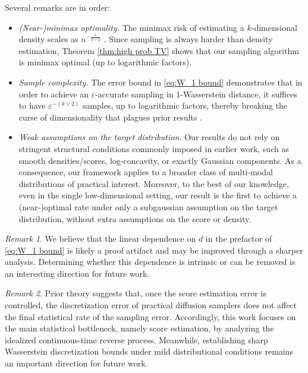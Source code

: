 \documentclass{article}
\newcommand{\veps}{\varepsilon}
\theoremstyle{plain}
\theoremstyle{remark}
\newtheorem{remark}{Remark}
\begin{document}
Several remarks are in order:
\begin{itemize}
    \item \textit{(Near-)minimax optimality.} The minimax risk of estimating a $k$-dimensional density scales as $n^{-\frac{1}{k \vee 2}}$ \citep{chewi2024statisticaloptimaltransport}.
    Since sampling is always harder than density estimation, Theorem \ref{thm:high prob TV} shows that our sampling algorithm is minimax optimal (up to logarithmic factors).
    
    \item \textit{Sample complexity.} The error bound in \eqref{eq:W_1 bound} demonstrates that in order to achieve an $\veps$-accurate sampling in 1-Wasserstein distance, it suffices to have $\veps^{- (k \vee 2)}$ samples, up to logarithmic factors, thereby breaking the curse of dimensionality that plagues prior results \citep{wibisono2024optimal,zhang2024minimaxoptimalityscorebaseddiffusion,dou2024optimalscorematchingoptimal,cai2025minimaxoptimalityprobabilityflow}.
    \item \textit{Weak assumptions on the target distribution.} 
    Our results do not rely on stringent structural conditions commonly imposed in earlier work, such as smooth densities/scores, log-concavity, or exactly Gaussian components.
    As a consequence, our framework applies to a broader class of multi-modal distributions of practical interest. 
    Moreover, to the best of our knowledge, even in the single low-dimensional setting, our result is the first to achieve a (near-)optimal rate under only a subgaussian assumption on the target distribution, without extra assumptions on the score or density.
\end{itemize}
\begin{remark}
We believe that the linear dependence on $d$ in the prefactor of \eqref{eq:W_1 bound} is likely a proof artifact and may be improved through a sharper analysis. Determining whether this dependence is intrinsic or can be removed is an interesting direction for future work.
\end{remark}

\begin{remark}
Prior theory \citep{cai2025minimaxoptimalityprobabilityflow} suggests that, once the score estimation error is controlled, the discretization error of practical diffusion samplers does not affect the final statistical rate of the sampling error. Accordingly, this work focuses on the main statistical bottleneck, namely score estimation, by analyzing the idealized continuous-time reverse process.
Meanwhile, establishing sharp Wasserstein discretization bounds under mild distributional conditions remains an important direction for future work.
\end{remark}
\end{document}
